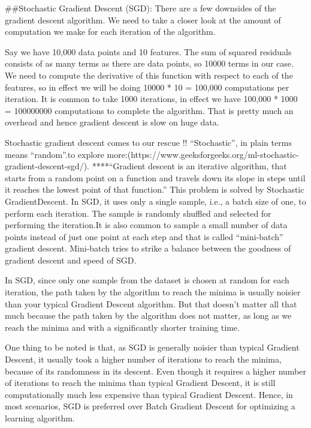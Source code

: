 ##Stochastic Gradient Descent (SGD):
   There are a few downsides of the gradient descent algorithm. We need to take a closer look at the amount of computation we make for each iteration of the algorithm.

Say we have 10,000 data points and 10 features. The sum of squared residuals consists of as many terms as there are data points, so 10000 terms in our case. We need to compute the derivative of this function with respect to each of the features, so in effect we will be doing 10000 * 10 = 100,000 computations per iteration. It is common to take 1000 iterations, in effect we have 100,000 * 1000 = 100000000 computations to complete the algorithm. That is pretty much an overhead and hence gradient descent is slow on huge data.

Stochastic gradient descent comes to our rescue !! “Stochastic”, in plain terms means “random”.to explore more:(https://www.geeksforgeeks.org/ml-stochastic-gradient-descent-sgd/).
****“Gradient descent is an iterative algorithm, that starts from a random point on a function and travels down its slope in steps until it reaches the lowest point of that function.”
 This problem is solved by Stochastic GradientDescent. In SGD, it uses only a single sample, i.e., a batch size of one, to perform each iteration. The sample is randomly shuffled and selected for performing the iteration.It is also common to sample a small number of data points instead of just one point at each step and that is called “mini-batch” gradient descent. Mini-batch tries to strike a balance between the goodness of gradient descent and speed of SGD.



In SGD, since only one sample from the dataset is chosen at random for each iteration, the path taken by the algorithm to reach the minima is usually noisier than your typical Gradient Descent algorithm. But that doesn’t matter all that much because the path taken by the algorithm does not matter, as long as we reach the minima and with a significantly shorter training time.

One thing to be noted is that, as SGD is generally noisier than typical Gradient Descent, it usually took a higher number of iterations to reach the minima, because of its randomness in its descent. Even though it requires a higher number of iterations to reach the minima than typical Gradient Descent, it is still computationally much less expensive than typical Gradient Descent. Hence, in most scenarios, SGD is preferred over Batch Gradient Descent for optimizing a learning algorithm.


